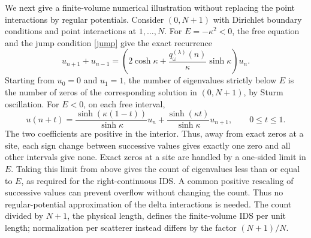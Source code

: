 \documentclass[12pt,a4paper]{article}
\numberwithin{equation}{section}
\begin{document}
We next give a finite-volume numerical illustration without replacing the point interactions by regular potentials.  Consider $(0,N+1)$ with Dirichlet boundary conditions and point interactions at $1,\ldots,N$.  For $E=-\kappa^2<0$, the free equation and the jump condition \eqref{jump} give the exact recurrence
\begin{equation}
u_{n+1}+u_{n-1}
=\left(
2\cosh\kappa
+\frac{q_\omega^{(\lambda)}(n)}{\kappa}\sinh\kappa
\right)u_n.
\label{numerical-recurrence}
\end{equation}
%
Starting from $u_0=0$ and $u_1=1$, the number of eigenvalues strictly below
$E$ is the number of zeros of the corresponding solution in $(0,N+1)$,
by Sturm oscillation.  For $E<0$, on each free interval,
\begin{equation}
 u(n+t)=\frac{\sinh(\kappa(1-t))}{\sinh\kappa}u_n
       +\frac{\sinh(\kappa t)}{\sinh\kappa}u_{n+1},
 \qquad 0\le t\le1.
\label{interval-interpolation}
\end{equation}
The two coefficients are positive in the interior.  Thus, away from exact
zeros at a site, each sign change between successive values gives exactly
one zero and all other intervals give none.  Exact zeros at a site are handled by a one-sided limit in $E$.
Taking this limit from above gives the count of eigenvalues less than or
equal to $E$, as required for the right-continuous IDS.  A common positive rescaling of successive values
can prevent overflow without changing the count.  Thus no regular-potential
approximation of the delta interactions is needed.  The count divided by
$N+1$, the physical length, defines the finite-volume IDS per unit length;
normalization per scatterer instead differs by the factor $(N+1)/N$.
\end{document}
